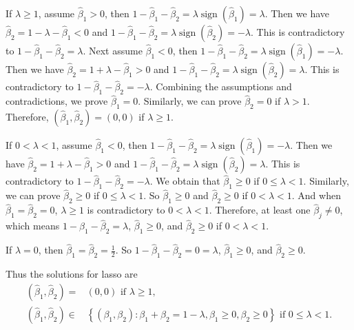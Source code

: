 \documentclass[a4 paper]{article}
\numberwithin{equation}{section}
\newcommand{\0}{\mathbf{0}}
\begin{document}
	If $\lambda \geq 1$, assume $\widehat{\beta}_1>0$, then $1 -\widehat{\beta}_1 -\widehat{\beta}_2 = \lambda \operatorname{sign}\left(\widehat{\beta}_1\right) = \lambda$. Then we have $\widehat{\beta}_2 =1-\lambda -\widehat{\beta}_1 <0$ and $1 -\widehat{\beta}_1 -\widehat{\beta}_2 = \lambda \operatorname{sign}\left(\widehat{\beta}_2\right) = -\lambda$. This is contradictory to $1 -\widehat{\beta}_1 -\widehat{\beta}_2 = \lambda$. Next assume $\widehat{\beta}_1<0$, then $1 -\widehat{\beta}_1 -\widehat{\beta}_2 = \lambda \operatorname{sign}\left(\widehat{\beta}_1\right) = -\lambda$. Then we have $\widehat{\beta}_2 = 1+\lambda -\widehat{\beta}_1 > 0$ and $1 -\widehat{\beta}_1 -\widehat{\beta}_2 = \lambda \operatorname{sign}\left(\widehat{\beta}_2\right) = \lambda$. This is contradictory to $1 -\widehat{\beta}_1 -\widehat{\beta}_2 = -\lambda$. Combining the assumptions and contradictions, we prove $\widehat{\beta}_1 = 0$. Similarly, we can prove $\widehat{\beta}_2 = 0$ if $\lambda > 1$. Therefore, $\left(\widehat{\beta}_1, \widehat{\beta}_2\right)=  (0,0)$ if $\lambda \geq 1$.
	
	If $0 < \lambda < 1$, assume $\widehat{\beta}_1<0$, then $1 -\widehat{\beta}_1 -\widehat{\beta}_2 = \lambda \operatorname{sign}\left(\widehat{\beta}_1\right) = -\lambda$. Then we have $\widehat{\beta}_2 = 1 + \lambda -\widehat{\beta}_1 > 0$ and $1 -\widehat{\beta}_1 -\widehat{\beta}_2 = \lambda \operatorname{sign}\left(\widehat{\beta}_2\right) = \lambda$. This is contradictory to $1 - \widehat{\beta}_1 -\widehat{\beta}_2 = -\lambda$. We obtain that $\widehat{\beta}_1 \geq 0$ if $0 \leq \lambda < 1$. Similarly, we can prove $\widehat{\beta}_2 \geq 0$ if $0 \leq \lambda < 1$. So $\widehat{\beta}_1 \geq 0$ and $\widehat{\beta}_2 \geq 0$ if $0 < \lambda < 1$. And when $\widehat{\beta}_1 = \widehat{\beta}_2 = 0$, $\lambda \geq 1$ is contradictory to $0 < \lambda < 1$. Therefore, at least one $\widehat{\beta}_j \neq 0$, which means $1-\widehat{\beta}_1 -\widehat{\beta}_2 =\lambda$, $\widehat{\beta}_1 \geq 0$, and $\widehat{\beta}_2 \geq 0$ if $0 < \lambda < 1$.
	
	If $\lambda = 0$, then $\widehat{\beta}_1 = \widehat{\beta}_2 = \frac{1}{2}$. So $1-\widehat{\beta}_1 -\widehat{\beta}_2 =0=\lambda$, $\widehat{\beta}_1 \geq 0$, and $\widehat{\beta}_2 \geq 0$.
	
	Thus the solutions for lasso are
	$$
	\begin{aligned}
		\left(\widehat{\beta}_1, \widehat{\beta}_2\right)= & (0,0) \text { if } \lambda \geq 1, \\
		\left(\widehat{\beta}_1, \widehat{\beta}_2\right) \in & \left\{\left(\beta_1, \beta_2\right): \beta_1+\beta_2=1-\lambda, \beta_1 \geq 0, \beta_2 \geq 0\right\}   \text { if } 0 \leq \lambda<1.
	\end{aligned}
	$$
	
\end{document}
